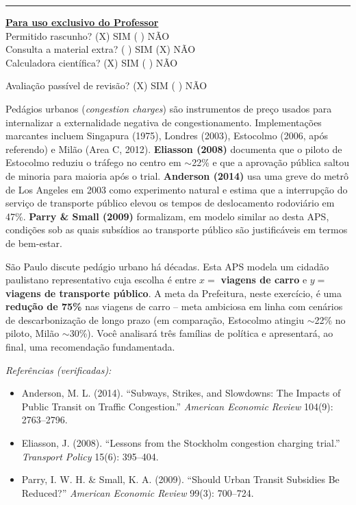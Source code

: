 \documentclass[11pt,addpoints]{exam}
\begin{document}
    \vspace{0.5em}
    \hrule
    \vspace{1em}
    \noindent\textbf{\underline{Para uso exclusivo do Professor}} \\[0.2em]

    Permitido rascunho? \hfill (X) SIM \quad (   ) NÃO\\[0.3em]
    Consulta a material extra? \hfill (   ) SIM \quad (X) NÃO\\[0.3em]
    Calculadora científica? \hfill (X) SIM \quad (   ) NÃO

    \vspace{0.6em}
    \noindent Avaliação passível de revisão? \hfill (X) SIM \quad (   ) NÃO

    \newpage
\fi

\begin{contextbox}
\small
Pedágios urbanos (\textit{congestion charges}) são instrumentos de preço usados para internalizar a externalidade negativa de congestionamento. Implementações marcantes incluem Singapura (1975), Londres (2003), Estocolmo (2006, após referendo) e Milão (Area C, 2012). \textbf{Eliasson (2008)} documenta que o piloto de Estocolmo reduziu o tráfego no centro em $\sim$22\% e que a aprovação pública saltou de minoria para maioria após o trial. \textbf{Anderson (2014)} usa uma greve do metrô de Los Angeles em 2003 como experimento natural e estima que a interrupção do serviço de transporte público elevou os tempos de deslocamento rodoviário em 47\%. \textbf{Parry \& Small (2009)} formalizam, em modelo similar ao desta APS, condições sob as quais subsídios ao transporte público são justificáveis em termos de bem-estar.

São Paulo discute pedágio urbano há décadas. Esta APS modela um cidadão paulistano representativo cuja escolha é entre $x =$ \textbf{viagens de carro} e $y =$ \textbf{viagens de transporte público}. A meta da Prefeitura, neste exercício, é uma \textbf{redução de 75\%} nas viagens de carro -- meta ambiciosa em linha com cenários de descarbonização de longo prazo (em comparação, Estocolmo atingiu $\sim$22\% no piloto, Milão $\sim$30\%). Você analisará três famílias de política e apresentará, ao final, uma recomendação fundamentada.

\medskip
\textit{Referências (verificadas):}
\begin{itemize}[noitemsep,topsep=0pt]
\item Anderson, M. L. (2014). ``Subways, Strikes, and Slowdowns: The Impacts of Public Transit on Traffic Congestion.'' \textit{American Economic Review} 104(9): 2763--2796.
\item Eliasson, J. (2008). ``Lessons from the Stockholm congestion charging trial.'' \textit{Transport Policy} 15(6): 395--404.
\item Parry, I. W. H. \& Small, K. A. (2009). ``Should Urban Transit Subsidies Be Reduced?'' \textit{American Economic Review} 99(3): 700--724.
\end{itemize}
\end{contextbox}
\end{document}
